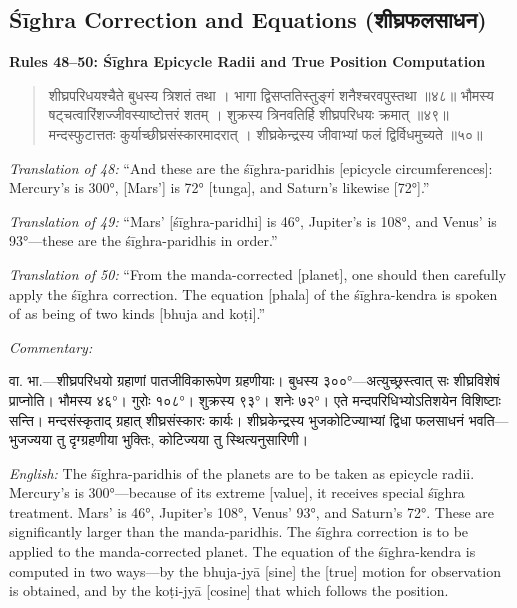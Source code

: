 \documentclass[11pt,a4paper]{book}
\newcommand{\dev}[1]{{\devanagarifont #1}}
\newenvironment{shloka}{%
  \begin{verse}
  \devanagarifont\color{versecolor}%
}{\end{verse}}
\newenvironment{vasaanaskt}{%
  \par\vspace{0.5em}\noindent\small\textit{Commentary:}%
}{\par\vspace{0.5em}}
\newcommand{\ruleheading}[1]{%
  \par\vspace{0.8em}\noindent\textbf{\color{sectioncolor}#1}\par\vspace{0.3em}%
}
\begin{document}
\subsection{Śīghra Correction and Equations (\dev{शीघ्रफलसाधन})}

\ruleheading{Rules 48--50: Śīghra Epicycle Radii and True Position Computation}

\begin{shloka}
\begin{altverse}
\dev{शीघ्रपरिधयश्चैते बुधस्य त्रिशतं तथा ।}
\dev{भागा द्विसप्ततिस्तुङ्गं शनैश्चरवपुस्तथा ॥४८॥}
\dev{भौमस्य षट्चत्वारिंशज्जीवस्याष्टोत्तरं शतम् ।}
\dev{शुक्रस्य त्रिनवतिर्हि शीघ्रपरिधयः क्रमात् ॥४९॥}
\dev{मन्दस्फुटात्ततः कुर्याच्छीघ्रसंस्कारमादरात् ।}
\dev{शीघ्रकेन्द्रस्य जीवाभ्यां फलं द्विर्विधमुच्यते ॥५०॥}
\end{altverse}
\end{shloka}

\textit{Translation of 48:} ``And these are the śīghra-paridhis [epicycle circumferences]: Mercury's is 300°, [Mars'] is 72° [tunga], and Saturn's likewise [72°].''

\textit{Translation of 49:} ``Mars' [śīghra-paridhi] is 46°, Jupiter's is 108°, and Venus' is 93°---these are the śīghra-paridhis in order.''

\textit{Translation of 50:} ``From the manda-corrected [planet], one should then carefully apply the śīghra correction. The equation [phala] of the śīghra-kendra is spoken of as being of two kinds [bhuja and koṭi].''

\begin{vasaanaskt}
\dev{वा. भा.}---शीघ्रपरिधयो ग्रहाणां पातजीविकारूपेण ग्रहणीयाः। बुधस्य ३००°---अत्युच्छ्रस्त्वात् सः शीघ्रविशेषं प्राप्नोति। भौमस्य ४६°। गुरोः १०८°। शुक्रस्य ९३°। शनेः ७२°। एते मन्दपरिधिभ्योऽतिशयेन विशिष्टाः सन्ति। मन्दसंस्कृताद् ग्रहात् शीघ्रसंस्कारः कार्यः। शीघ्रकेन्द्रस्य भुजकोटिज्याभ्यां द्विधा फलसाधनं भवति---भुजज्यया तु दृग्ग्रहणीया भुक्तिः, कोटिज्यया तु स्थित्यनुसारिणी।

\textit{English:} The śīghra-paridhis of the planets are to be taken as epicycle radii. Mercury's is 300°---because of its extreme [value], it receives special śīghra treatment. Mars' is 46°, Jupiter's 108°, Venus' 93°, and Saturn's 72°. These are significantly larger than the manda-paridhis. The śīghra correction is to be applied to the manda-corrected planet. The equation of the śīghra-kendra is computed in two ways---by the bhuja-jyā [sine] the [true] motion for observation is obtained, and by the koṭi-jyā [cosine] that which follows the position.
\end{vasaanaskt}
\end{document}
